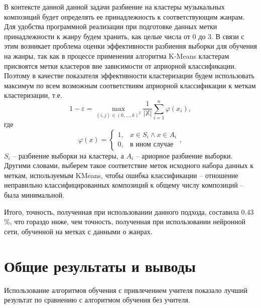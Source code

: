 В контексте данной данной задачи разбиение на кластеры музыкальных композиций будет определять ее принадлежность к соответствующим жанрам.
Для удобства программной реализации при подготовке данных метки принадлежности к жанру
будем хранить, как целые числа от 0 до 3. В связи с этим возникает проблема оценки эффективности
разбиения выборки для обучения на жанры, так как в процессе применения алгоритма K-Means кластерам
присвоятся метки кластеров вне зависимости от априорной классификации. Поэтому в качестве показателя эффективности
кластеризации будем использовать максимум по всем возможным соответствиям априорной классификации к меткам кластеризации, т.е.
\begin{equation}
	1 - \varepsilon = \underset{(i,j) \in (0, \dots, k)^2}{\max} \frac{1}{\left|\mathbb{X}\right|}\sum_{i=1}^n \varphi(x_i),
\end{equation}
где
	$$\varphi(x) = 
	\begin{cases}
		1, &  x \in S_i \wedge x \in A_i \\
		0, & \text{в ином случае}
	\end{cases}, $$
	$S_i$ -- разбиение выборки на кластеры, а $A_i$ -- ариорное разбиение выборки.
Другими словами, выберем такое соответствие меток исходного набора данных к меткам, используемым KMeans, чтобы ошибка классификации -- отношение неправильно классифицированных композиций к общему числу композиций -- была минимальной.

Итого, точность, полученная при использовании данного подхода, составила $0.43$\%, что гораздо ниже, чем точность, полученная при использовании нейронной сети, обученной на метках с данными о жанрах.

\chapter{Общие результаты и выводы}

Использование алгоритмов обучения с привлечением учителя показало лучший результат по сравнению с алгоритмом обучения без учителя.